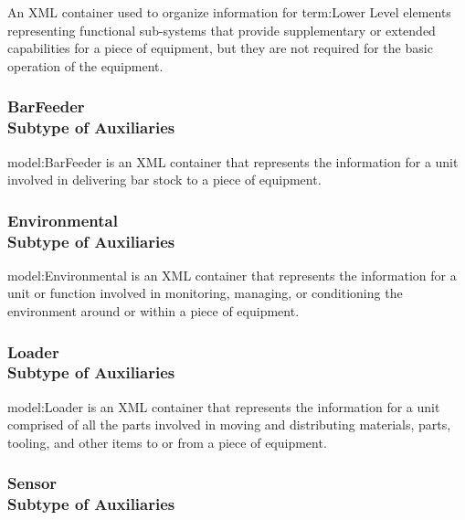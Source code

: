 \FloatBarrier

An XML container used to organize information for {term:Lower Level} elements representing functional sub-systems that provide supplementary or extended capabilities for a piece of equipment, but they are not required for the basic operation of the equipment.

\FloatBarrier
\subsubsection[BarFeeder]{BarFeeder \\ {\small Subtype of Auxiliaries}}
  \label{type:BarFeeder}

\FloatBarrier

{model:BarFeeder} is an XML container that represents the information for a unit involved in delivering bar stock to a piece of equipment.

\FloatBarrier
\subsubsection[Environmental]{Environmental \\ {\small Subtype of Auxiliaries}}
  \label{type:Environmental}

\FloatBarrier

{model:Environmental} is an XML container that represents the information for a unit or function involved in monitoring, managing, or conditioning the environment around or within a piece of equipment.

\FloatBarrier
\subsubsection[Loader]{Loader \\ {\small Subtype of Auxiliaries}}
  \label{type:Loader}

\FloatBarrier

{model:Loader} is an XML container that represents the information for a unit comprised of all the parts involved in moving and distributing materials, parts, tooling, and other items to or from a piece of equipment.

\FloatBarrier
\subsubsection[Sensor]{Sensor \\ {\small Subtype of Auxiliaries}}
  \label{type:Sensor}

